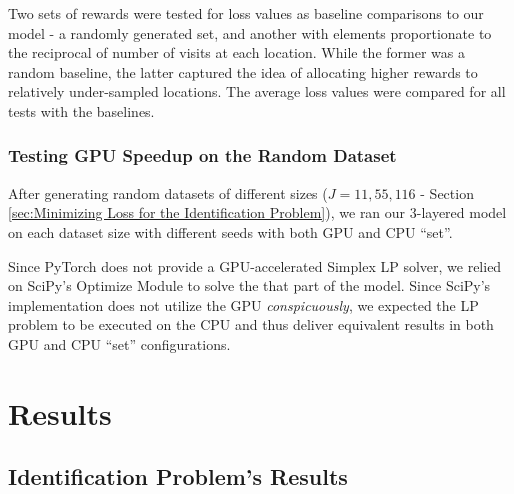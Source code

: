 \documentclass[12pt]{article}
\begin{document}
    Two sets of rewards were tested for loss values as baseline comparisons to our model - a randomly generated set, and another with elements proportionate to the reciprocal of number of visits at each location. While the former was a random baseline, the latter captured the idea of allocating higher rewards to relatively under-sampled locations. The average loss values were compared for all tests with the baselines.
    
    \subsubsection{Testing GPU Speedup on the Random Dataset} \label{sec:Pricing Problem-Testing GPU Speedup on the Random Dataset}
    After generating random datasets of different sizes ($J = 11, 55, 116$ - Section \ref{sec:Minimizing Loss for the Identification Problem}), we ran our 3-layered model on each dataset size with different seeds with both GPU and CPU ``set''.
    
    Since PyTorch does not provide a GPU-accelerated Simplex LP solver, we relied on SciPy's Optimize Module to solve the that part of the model. Since SciPy's implementation does not utilize the GPU \textit{conspicuously}, we expected the LP problem to be executed on the CPU and thus deliver equivalent results in both GPU and CPU ``set'' configurations.
    
    \section{Results} \label{sec:Results}
    \subsection{Identification Problem's Results} \label{sec:Identification Problem's Results}
\end{document}
